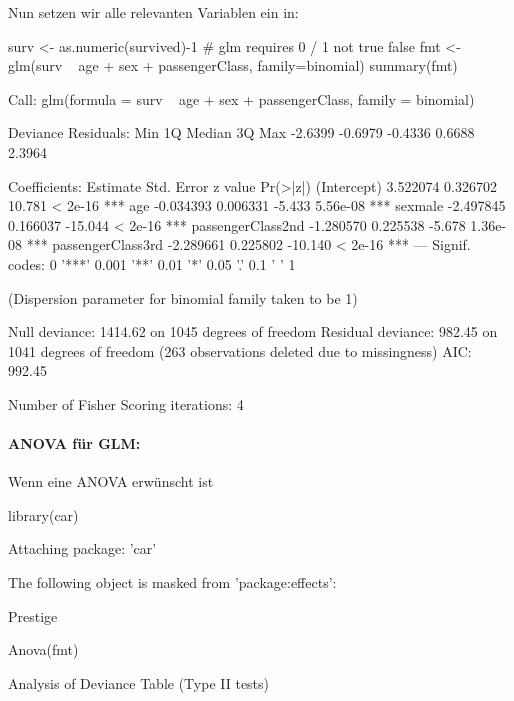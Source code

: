 \documentclass[a4paper,twoside]{tufte-book}\usepackage[]{graphicx}\usepackage[]{color}
\begin{document}
\begin{appendices}
Nun setzen wir alle relevanten Variablen ein in:

\begin{Schunk}
\begin{Sinput}
surv <- as.numeric(survived)-1 # glm requires 0 / 1 not true false
fmt <- glm(surv ~ age  + sex + passengerClass, family=binomial)
summary(fmt)
\end{Sinput}
\begin{Soutput}

Call:
glm(formula = surv ~ age + sex + passengerClass, family = binomial)

Deviance Residuals: 
    Min       1Q   Median       3Q      Max  
-2.6399  -0.6979  -0.4336   0.6688   2.3964  

Coefficients:
                   Estimate Std. Error z value Pr(>|z|)    
(Intercept)        3.522074   0.326702  10.781  < 2e-16 ***
age               -0.034393   0.006331  -5.433 5.56e-08 ***
sexmale           -2.497845   0.166037 -15.044  < 2e-16 ***
passengerClass2nd -1.280570   0.225538  -5.678 1.36e-08 ***
passengerClass3rd -2.289661   0.225802 -10.140  < 2e-16 ***
---
Signif. codes:  0 '***' 0.001 '**' 0.01 '*' 0.05 '.' 0.1 ' ' 1

(Dispersion parameter for binomial family taken to be 1)

    Null deviance: 1414.62  on 1045  degrees of freedom
Residual deviance:  982.45  on 1041  degrees of freedom
  (263 observations deleted due to missingness)
AIC: 992.45

Number of Fisher Scoring iterations: 4
\end{Soutput}
\end{Schunk}

\paragraph{ANOVA für GLM:} Wenn eine ANOVA erwünscht ist

\begin{Schunk}
\begin{Sinput}
library(car)
\end{Sinput}
\begin{Soutput}

Attaching package: 'car'
\end{Soutput}
\begin{Soutput}
The following object is masked from 'package:effects':

    Prestige
\end{Soutput}
\begin{Sinput}
Anova(fmt)
\end{Sinput}
\begin{Soutput}
Analysis of Deviance Table (Type II tests)


\end{Soutput}
\end{Schunk}
\end{appendices}
\end{document}
